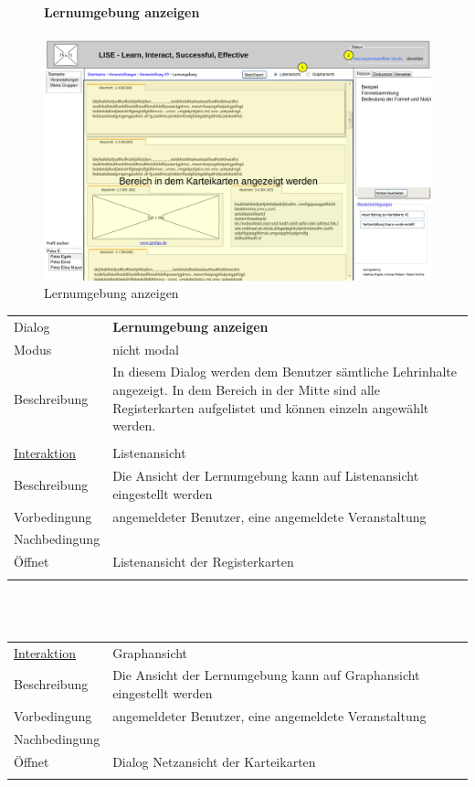 \documentclass[12pt,a4paper]{article}
\begin{document}
{\begin{figure}[H]
	\paragraph{Lernumgebung anzeigen}
	\includegraphics[width=\textwidth]{Bilder/Mockups/GUI/KarteikartenAnzeigen[Benutzer].png}
	\caption{Lernumgebung anzeigen}
	\label{GuiLernumgebungAnzeigen}
\end{figure}
\begin{tabular}{l p{12cm}}
Dialog 	 			& \textbf{Lernumgebung anzeigen} \\ 
Modus 				& nicht modal\\ 
Beschreibung   	 	& In diesem Dialog werden dem Benutzer sämtliche Lehrinhalte angezeigt. In dem Bereich in der Mitte sind alle Registerkarten aufgelistet und können einzeln angewählt werden.\\\\ 

\underline{Interaktion}  	 & Listenansicht\\ 
Beschreibung   	 			 & Die Ansicht der Lernumgebung kann auf  Listenansicht eingestellt werden\\
Vorbedingung				 & angemeldeter Benutzer, eine angemeldete Veranstaltung \\
Nachbedingung				 & \\
Öffnet						 & \glqq Listenansicht der Registerkarten\grqq \\\\
\end{tabular} \\\\
\begin{tabular}{l p{12cm}}
\underline{Interaktion}  	 & Graphansicht\\ 
Beschreibung   				 & Die Ansicht der Lernumgebung kann auf  Graphansicht eingestellt werden  \\
Vorbedingung				 & angemeldeter Benutzer, eine angemeldete Veranstaltung \\
Nachbedingung				 & \\
Öffnet			 			 & \glqq Dialog Netzansicht der Karteikarten\grqq \\\\


\end{tabular}}
\end{document}
